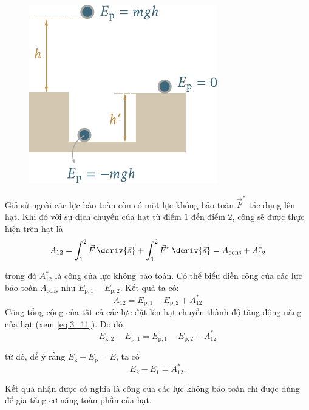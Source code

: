 \begin{figure}[!htb]
	\begin{center}
		\includegraphics[scale=1]{figures/ch_03/fig_3_10.pdf}
		\caption[]{}
		\label{fig:3_10}
	\end{center}
\end{figure}

Giả sử ngoài các lực bảo toàn còn có một lực không bảo toàn $\vec{F}^*$ tác dụng lên hạt. Khi đó với sự dịch chuyển của hạt từ điểm $1$ đến điểm $2$, công sẽ được thực hiện trên hạt là 
\begin{equation*}
A_{12} = \int_{1}^{2} \vec{F}\,\deriv{\vec{s}} + \int_{1}^{2} \vec{F}^*\,\deriv{\vec{s}} = A_{\text{cons}} + A_{12}^*
\end{equation*}

\noindent
trong đó  $A_{12}^*$ là công của lực không bảo toàn. Có thể biểu diễn công của các lực bảo toàn $A_{\text{cons}}$ như $E_{\text{p},1}-E_{\text{p},2}$. Kết quả ta có:
\begin{equation*}
A_{12} = E_{\text{p},1} - E_{\text{p},2} + A_{12}^*
\end{equation*}
\noindent
Công tổng cộng của tất cả các lực đặt lên hạt chuyển thành độ tăng động năng của hạt (xem \eqref{eq:3_11}). Do đó,
\begin{equation*}
E_{\text{k},2} - E_{\text{p},1} = E_{\text{p},1} - E_{\text{p},2} + A_{12}^*
\end{equation*}

\noindent
từ đó, để ý rằng  $E_{\text{k}}+E_{\text{p}}=E$, ta có
\begin{equation}\label{eq:3_37}
E_2 - E_1 = A_{12}^*.
\end{equation}

\noindent
Kết quả nhận được có nghĩa là công của các lực không bảo toàn chỉ được dùng để gia tăng cơ năng toàn phần của hạt. 

